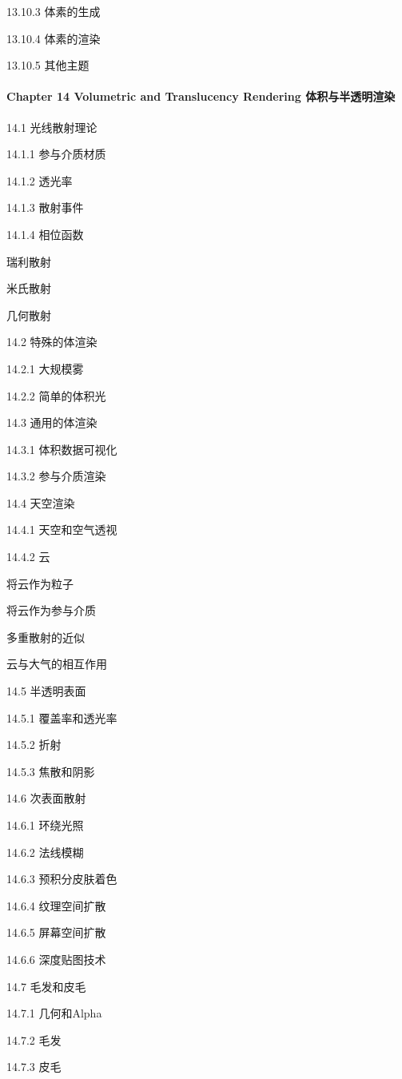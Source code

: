 \documentclass[
  paper=a4,
  ,captions=tableheading
]{scrartcl}
\begin{document}
13.10.3 体素的生成

13.10.4 体素的渲染

13.10.5 其他主题

\paragraph{Chapter 14 Volumetric and Translucency Rendering
体积与半透明渲染}\label{chapter-14-volumetric-and-translucency-rendering-ux4f53ux79efux4e0eux534aux900fux660eux6e32ux67d3}

14.1 光线散射理论

14.1.1 参与介质材质

14.1.2 透光率

14.1.3 散射事件

14.1.4 相位函数

瑞利散射

米氏散射

几何散射

14.2 特殊的体渲染

14.2.1 大规模雾

14.2.2 简单的体积光

14.3 通用的体渲染

14.3.1 体积数据可视化

14.3.2 参与介质渲染

14.4 天空渲染

14.4.1 天空和空气透视

14.4.2 云

将云作为粒子

将云作为参与介质

多重散射的近似

云与大气的相互作用

14.5 半透明表面

14.5.1 覆盖率和透光率

14.5.2 折射

14.5.3 焦散和阴影

14.6 次表面散射

14.6.1 环绕光照

14.6.2 法线模糊

14.6.3 预积分皮肤着色

14.6.4 纹理空间扩散

14.6.5 屏幕空间扩散

14.6.6 深度贴图技术

14.7 毛发和皮毛

14.7.1 几何和Alpha

14.7.2 毛发

14.7.3 皮毛
\end{document}
